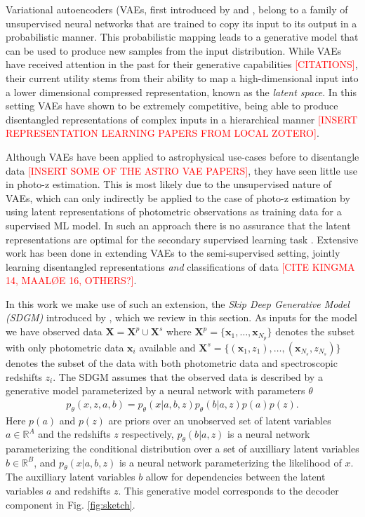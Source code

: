 Variational autoencoders (VAEs, first introduced by \cite{kingmaAutoEncodingVariationalBayes2022} and \cite{rezendeStochasticBackpropagationApproximate2014}, belong to a family of unsupervised neural networks that are trained to copy its input to its output in a probabilistic manner. This probabilistic mapping leads to a generative model that can be used to produce new samples from the input distribution. 
While VAEs have received attention in the past for their generative capabilities \textcolor{red}{[CITATIONS]}, their current utility stems from their ability to map a high-dimensional input into a lower dimensional compressed representation, known as the \textit{latent space}. In this setting VAEs have shown to be extremely competitive, being able to produce disentangled representations of complex inputs in a hierarchical manner \textcolor{red}{[INSERT REPRESENTATION LEARNING PAPERS FROM LOCAL ZOTERO]}. 

Although VAEs have been applied to astrophysical use-cases before to disentangle data \textcolor{red}{[INSERT SOME OF THE ASTRO VAE PAPERS]}, they have seen little use in photo-z estimation. This is most likely due to the unsupervised nature of VAEs, which can only indirectly be applied to the case of photo-z estimation by using latent representations of photometric observations as training data for a supervised ML model. In such an approach there is no assurance that the latent representations are optimal for the secondary supervised learning task \citep{kingmaSemiSupervisedLearningDeep2014}. Extensive work has been done in extending VAEs to the semi-supervised setting, jointly learning disentangled representations \textit{and} classifications of data \textcolor{red}{[CITE KINGMA 14, MAALØE 16, OTHERS?]}.

In this work we make use of such an extension, the \textit{Skip Deep Generative Model (SDGM)} introduced by \cite{maaløe}, which we review in this section. As inputs for the model we have observed data $\mathbf{X} = \mathbf{X}^p \cup \mathbf{X}^s$ where $\mathbf{X}^p = \{ \mathbf{x}_1,\dots,\mathbf{x}_{N_p} \}$ denotes the subset with only photometric data $\mathbf{x}_i$ available and $\mathbf{X}^s = \{ (\mathbf{x}_1, z_1), \dots , (\mathbf{x}_{N_s}, z_{N_s}) \}$ denotes the subset of the data with both photometric data and spectroscopic redshifts $z_i$. The SDGM assumes that the observed data is described by a generative model parameterized by a neural network with parameters $\theta$ 
\begin{align}
    p_\theta(x, z, a, b) = p_\theta(x|a,b,z) p_\theta(b|a,z) p(a) p(z).    
\end{align}
Here $p(a)$ and $p(z)$ are priors over an unobserved set of latent variables $a\in\mathbb{R}^A$ and the redshifts $z$ respectively, $p_\theta(b|a,z)$ is a neural network parameterizing the conditional distribution over a set of auxilliary latent variables $b\in\mathbb{R}^B$, and $p_\theta(x|a,b,z)$ is a neural network parameterizing the likelihood of $x$. The auxilliary latent variables $b$ allow for dependencies between the latent variables $a$ and redshifts $z$. This generative model corresponds to the decoder component in Fig. \ref{fig:sketch}.

